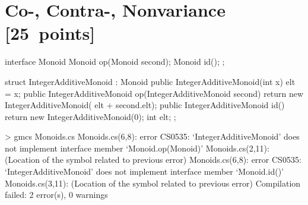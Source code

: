 \documentclass{article}
\begin{document}
\newpage
\section{Co-, Contra-, Nonvariance [25~points]}


\begin{java}
interface Monoid {
   Monoid op(Monoid second);
   Monoid id();
};

struct IntegerAdditiveMonoid : Monoid {
    public IntegerAdditiveMonoid(int x) { 
         elt = x;
    }    
    public IntegerAdditiveMonoid op(IntegerAdditiveMonoid second) { 
         return new IntegerAdditiveMonoid(
             elt + second.elt); 
    }
    public IntegerAdditiveMonoid id(){ 
         return new IntegerAdditiveMonoid(0);
    }
    int elt;
};

> gmcs Monoids.cs 
Monoids.cs(6,8): error CS0535: `IntegerAdditiveMonoid' does not implement 
  interface member `Monoid.op(Monoid)'
Monoids.cs(2,11): (Location of the symbol related to previous error)
Monoids.cs(6,8): error CS0535: `IntegerAdditiveMonoid' does not implement 
  interface member `Monoid.id()'
Monoids.cs(3,11): (Location of the symbol related to previous error)
Compilation failed: 2 error(s), 0 warnings

\end{java}
%
\end{document}
